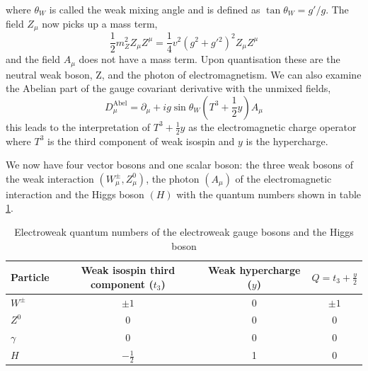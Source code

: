 where $\theta_{W}$ is called the weak mixing angle and is defined as $\tan{\theta_{W}} = g'/g$. The field $Z_{\mu}$ now picks up a mass term,
\begin{equation}
    \frac{1}{2} m_{Z}^{2} Z_{\mu} Z^{\mu} = \frac{1}{4}v^{2}(g^{2}+g'{^2})^{2}Z_{\mu}Z^{\mu}
    \label{eq:theory:Z_mass}
\end{equation}
and the field $A_{\mu}$ does not have a mass term. Upon quantisation these are the neutral weak boson, Z, and the photon of electromagnetism.
We can also examine the Abelian part of the gauge covariant derivative with the unmixed fields, 
\begin{equation}
    D_{\mu}^{\mathrm{Abel}} = \partial_{\mu} + ig\sin{\theta_{W}}(T^{3} + \frac{1}{2}y)A_{\mu}
    \label{eq:theory:charge_operator}
\end{equation}
this leads to the interpretation of $T^{3} + \frac{1}{2}y$ as the electromagnetic charge operator where $T^{3}$ is the third component of weak isospin and $y$ is the hypercharge.


We now have four vector bosons and one scalar boson: the three weak bosons of the weak interaction $(W_{\mu}^{\pm},Z_{\mu}^{0})$, the photon $(A_{\mu})$ of the electromagnetic interaction and the Higgs boson $(H)$ with the quantum numbers shown in table \ref{tab:theory:elecroweak_qn_bosons}.
\begin{table}[h!]
\begin{tabular}{ l | c | c | c }
    Particle & Weak isospin third component ($t_{3}$) & Weak hypercharge ($y$) & $Q = t_3 + \frac{y}{2}$ \\
    \hline
    $W^{\pm}$  & $\pm{1}$ & 0 & $\pm1$ \\
    $Z^{0}$    & 0 & 0 & 0 \\
    $\gamma$    & 0 & 0 & 0 \\
    $H$        & $-\frac{1}{2}$ & 1 & 0 \\
\end{tabular}
\caption{Electroweak quantum numbers of the electroweak gauge bosons and the Higgs boson}
 \label{tab:theory:elecroweak_qn_bosons}
\end{table}


